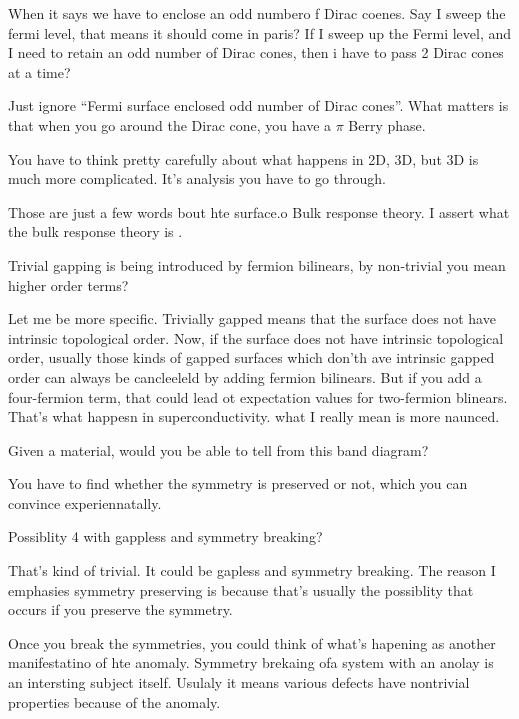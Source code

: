 \begin{question}
    When it says we have to enclose an odd numbero f Dirac coenes.
    Say I sweep the fermi level,
    that means it should come in paris?
    If I sweep up the Fermi level,
    and I need to retain an odd number of Dirac cones,
    then i have to pass 2 Dirac cones at a time?
\end{question}
Just ignore ``Fermi surface enclosed odd number of Dirac cones''.
What matters is that when you go around the Dirac cone,
you have a $\pi$ Berry phase.

You have to think pretty carefully about what happens in 2D, 3D, but 3D is much
more complicated.
It's analysis you have to go through.


Those are just a few words bout hte surface.o
Bulk response theory.
I assert what the bulk response theory is .

\begin{question}
    Trivial gapping is being introduced by fermion bilinears,
    by non-trivial you mean higher order terms?
\end{question}
Let me be more specific.
Trivially gapped means that the surface does not have intrinsic topological
order.
Now,
if the surface does not have intrinsic topological order,
usually those kinds of gapped surfaces which don'th ave intrinsic gapped order
can always be cancleeleld by adding fermion bilinears.
But if you add a four-fermion term,
that could lead ot expectation values for two-fermion blinears.
That's what happesn in superconductivity.
what I really mean is more naunced.

\begin{question}
    Given a material,
    would you be able to tell from this band diagram?
\end{question}
You have to find whether the symmetry is preserved or not,
which you can convince experiennatally.

\begin{question}
    Possiblity 4 with gappless and symmetry breaking?
\end{question}
That's kind of trivial.
It could be gapless and symmetry breaking.
The reason I emphasies symmetry preserving is because that's usually the
possiblity that occurs if you preserve the symmetry.

Once you break the symmetries,
you could think of what's hapening as another manifestatino of hte anomaly.
Symmetry brekaing ofa system with an anolay is an intersting subject itself.
Usulaly it means various defects have nontrivial properties because of the
anomaly.

